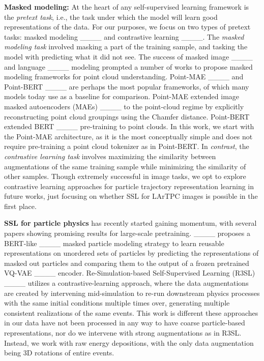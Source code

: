 \textbf{Masked modeling:} At the heart of any self-supervised learning framework is the \textit{pretext task}, i.e., the task under which the model will learn good representations of the data. For our purposes, we focus on two types of pretext tasks: masked modeling ____ and contrastive learning ____. The \textit{masked modeling task} involved masking a part of the training sample, and tasking the model with predicting what it did not see. The success of masked image ____ and language ____ modeling prompted a number of works to propose masked modeling frameworks for point cloud understanding. Point-MAE ____ and Point-BERT ____ are perhaps the most popular frameworks, of which many models today use as a baseline for comparison. Point-MAE extended image masked autoencoders (MAEs) ____ to the point-cloud regime by explicitly reconstructing point cloud groupings using the Chamfer distance. Point-BERT extended BERT ____ pre-training to point clouds. In this work, we start with the Point-MAE architecture, as it is the most conceptually simple and does not require pre-training a point cloud tokenizer as in Point-BERT. In \textit{contrast}, the \textit{contrastive learning task} involves maximizing the similarity between augmentations of the same training sample while minimizing the similarity of other samples. 
Though extremely successful in image tasks, we opt to explore contrastive learning approaches for particle trajectory representation learning in future works, just focusing on whether SSL for LArTPC images is possible in the first place.

\textbf{SSL for particle physics} has recently started gaining momentum, with several papers showing promising results for large-scale pretraining. ____ proposes a BERT-like ____ masked particle modeling strategy to learn reusable representations on unordered sets of particles by predicting the representations of masked out particles and comparing them to the output of a frozen pretrained VQ-VAE ____ encoder. Re-Simulation-based Self-Supervised Learning (R3SL) ____ utilizes a contrastive-learning approach, where the data augmentations are created by intervening mid-simulation to re-run downstream physics processes with the same initial conditions multiple times over, generating multiple consistent realizations of the same events. This work is different these approaches in our data have not been processed in any way to have coarse particle-based representations, nor do we intervene with strong augmentations as in R3SL. Instead, we work with raw energy depositions, with the only data augmentation being 3D rotations of entire events.

